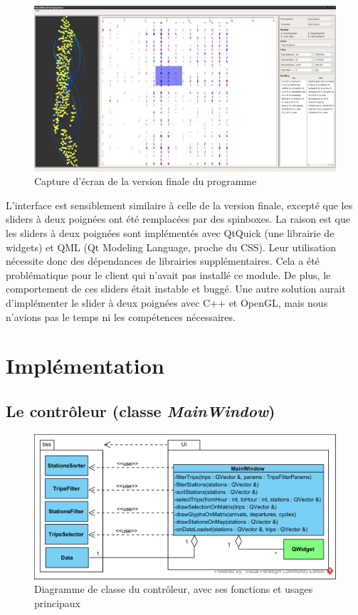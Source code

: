 \documentclass[12pt]{article}
\begin{document}
		\begin{figure}[!h]
		\begin{center}
		\includegraphics[scale=.25]{screen_final_2.png}
		\caption{Capture d’écran de la version finale du programme}
		\end{center}
		\end{figure}
		
		L’interface est sensiblement similaire à celle de la version finale, excepté que les sliders à deux poignées ont été remplacées par des spinboxes. La raison est que les sliders à deux poignées sont implémentés avec QtQuick (une librairie de widgets) et QML (Qt Modeling Language, proche du CSS). Leur utilisation nécessite donc des dépendances de librairies supplémentaires. Cela a été problématique pour le client qui n’avait pas installé ce module. De plus, le comportement de ces sliders était instable et buggé. Une autre solution aurait d'implémenter le slider à deux poignées avec C++ et OpenGL, mais nous n’avions pas le temps ni les compétences nécessaires.
		

	\newpage
	\section{Implémentation}
		\subsection{Le contrôleur (classe \textit{MainWindow})}
		\begin{figure}[!h]
		\begin{center}
		\includegraphics[scale=1]{class_diagram_controleur.png}
		\caption{Diagramme de classe du contrôleur, avec ses fonctions et usages principaux}
		\label{fig:dia_controleur}
		\end{center}
		\end{figure}
					
\end{document}
